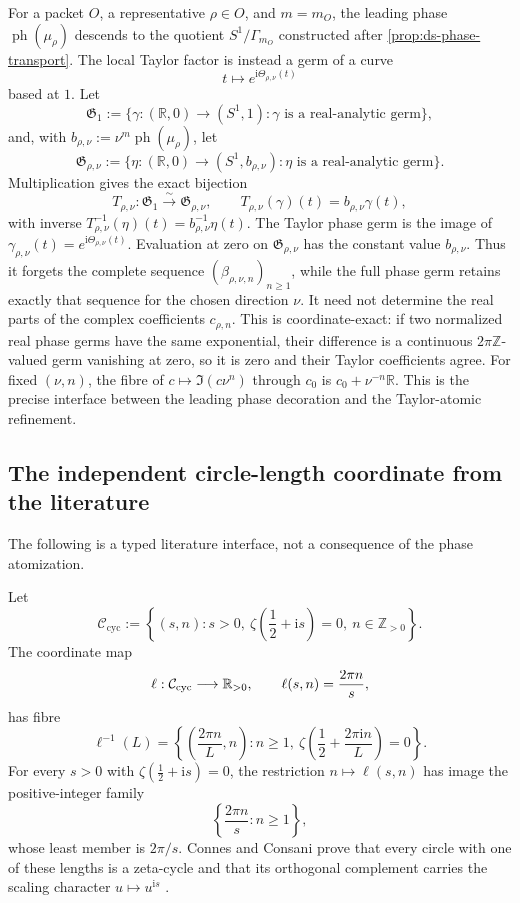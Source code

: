 For a packet \(O\), a representative \(\rho\in O\), and \(m=m_O\), the leading
phase \(\operatorname{ph}(\mu_\rho)\) descends to the quotient
\(S^1/\Gamma_{m_O}\) constructed after
\cref{prop:ds-phase-transport}.  The local Taylor factor is instead a germ of
a curve
\[
 t\longmapsto e^{\mathrm i\Theta_{\rho,\nu}(t)}
\]
based at \(1\).  Let
\[
 \mathfrak G_1
 :=
 \{\gamma:(\mathbb R,0)\to(S^1,1):
 \gamma\text{ is a real-analytic germ}\},
\]
and, with \(b_{\rho,\nu}:=\nu^m\operatorname{ph}(\mu_\rho)\), let
\[
 \mathfrak G_{\rho,\nu}
 :=
 \{\eta:(\mathbb R,0)\to(S^1,b_{\rho,\nu}):
 \eta\text{ is a real-analytic germ}\}.
\]
Multiplication gives the exact bijection
\[
 T_{\rho,\nu}:\mathfrak G_1\overset{\sim}{\longrightarrow}
 \mathfrak G_{\rho,\nu},
 \qquad
 T_{\rho,\nu}(\gamma)(t)=b_{\rho,\nu}\gamma(t),
\]
with inverse
\(T_{\rho,\nu}^{-1}(\eta)(t)=b_{\rho,\nu}^{-1}\eta(t)\).
The Taylor phase germ is the image of
\(\gamma_{\rho,\nu}(t)=e^{\mathrm i\Theta_{\rho,\nu}(t)}\).
Evaluation at zero on \(\mathfrak G_{\rho,\nu}\) has the constant value
\(b_{\rho,\nu}\).  Thus it forgets the
 complete sequence \((\beta_{\rho,\nu,n})_{n\geq1}\), while the full phase germ
 retains exactly that sequence for the chosen direction \(\nu\).  It need not
 determine the real parts of the complex coefficients \(c_{\rho,n}\).  This is
coordinate-exact: if two normalized real phase germs have the same exponential,
their difference is a continuous \(2\pi\mathbb Z\)-valued germ vanishing at zero,
so it is zero and their Taylor coefficients agree.  For fixed \((\nu,n)\), the
fibre of \(c\mapsto\Im(c\nu^n)\) through \(c_0\) is
\(c_0+\nu^{-n}\mathbb R\).  This is the precise interface between the leading
phase decoration and the Taylor-atomic refinement.

\subsection{The independent circle-length coordinate from the literature}

The following is a typed literature interface, not a consequence of the phase
atomization.

\begin{proposition}
\label{prop:phase-cycle-coordinate}
Let
\[
 \mathcal C_{\mathrm{cyc}}
 :=
 \left\{
 (s,n):
 s>0,\ \zeta\left(\frac12+\mathrm is\right)=0,\
 n\in\mathbb Z_{>0}
 \right\}.
\]
The coordinate map
\[
 \ell:\mathcal C_{\mathrm{cyc}}\longrightarrow\mathbb R_{>0},
 \qquad
 \ell(s,n)=\frac{2\pi n}{s},
\]
has fibre
\[
 \ell^{-1}(L)
 =
 \left\{
 \left(\frac{2\pi n}{L},n\right):
 n\geq1,\
 \zeta\left(\frac12+\frac{2\pi\mathrm in}{L}\right)=0
 \right\}.
\]
For every \(s>0\) with \(\zeta(\tfrac12+\mathrm is)=0\), the restriction
\(n\mapsto\ell(s,n)\) has image the positive-integer family
\[
 \left\{\frac{2\pi n}{s}:n\geq1\right\},
\]
whose least member is \(2\pi/s\).  Connes and Consani prove that every circle
with one of these lengths is a zeta-cycle and that its orthogonal complement
carries the scaling character \(u\mapsto u^{\mathrm is}\)
\cite[\S6]{connesConsani2021ZetaCycles}.
\end{proposition}

